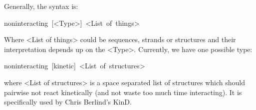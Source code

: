 \documentclass{article}
\newenvironment{code}
{\par\begin{list}{}{
\setlength{\rightmargin}{\leftmargin}
\setlength{\listparindent}{0pt}
\raggedright
\setlength{\itemsep}{0pt}
\setlength{\parsep}{0pt}
\normalfont\ttfamily}
 \item[]}
{\end{list}}
\begin{document}
Generally, the syntax is:
\begin{code}
noninteracting~{[}<Type>{]}~<List~of~things>
\end{code}
Where <List of things> could be sequences, strands or structures and
their interpretation depends up on the <Type>. Currently, we have
one possible type:
\begin{code}
noninteracting~{[}kinetic{]}~<List~of~structures>
\end{code}
where <List of structures> is a space separated list of structures
which should pairwise not react kinetically (and not waste too much
time interacting). It is specifically used by Chris Berlind's KinD.
\end{document}
